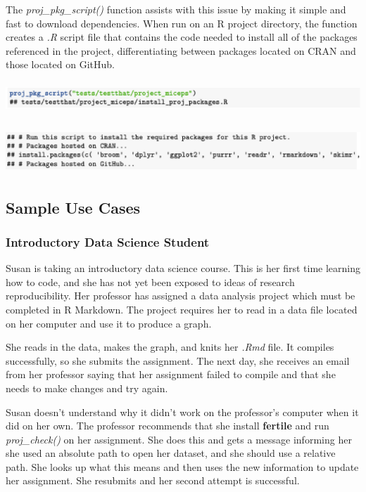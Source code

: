\documentclass[APA,LATO1COL]{WileyNJD-v2}
\begin{document}
The \textit{proj\_pkg\_script()} function assists with this issue by making it simple and fast to download dependencies. When run on an R project directory, the function creates a \textit{.R} script file that contains the code needed to install all of the packages referenced in the project, differentiating between packages located on CRAN and those located on GitHub.


\vskip 0.25in

\centerline{\includegraphics[height=3pc,width=180mm]{fig-12}}

\vskip 0.25in

\centerline{\includegraphics[height=4pc,width=180mm]{fig-13}}

\vskip 0.25in



\subsection{Sample Use Cases}

\vskip 0.25in

\subsubsection{Introductory Data Science Student}

Susan is taking an introductory data science course. This is her first time learning how to code, and she has not yet been exposed to ideas of research reproducibility. Her professor has assigned a data analysis project which must be completed in R Markdown. The project requires her to read in a data file located on her computer and use it to produce a graph.

She reads in the data, makes the graph, and knits her \textit{.Rmd} file. It compiles successfully, so she submits the assignment. The next day, she receives an email from her professor saying that her assignment failed to compile and that she needs to make changes and try again.

Susan doesn't understand why it didn't work on the professor's computer when it did on her own. The professor recommends that she install \textbf{fertile} and run \textit{proj\_check()} on her assignment. She does this and gets a message informing her she used an absolute path to open her dataset, and she should use a relative path. She looks up what this means and then uses the new information to update her assignment. She resubmits and her second attempt is successful.
\end{document}
